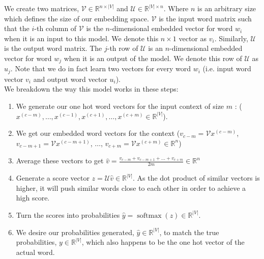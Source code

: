 \documentclass[nobib]{tufte-handout}
\begin{document}
We create two matrices, $\mathcal{V} \in \mathbb{R}^{n\times|V|}$ and $\mathcal{U} \in \mathbb{R}^{|V|\times n}$. Where $n$ is an arbitrary size which defines the size of our embedding space. $\mathcal{V}$ is the input word matrix such that the $i$-th column of $\mathcal{V}$ is the $n$-dimensional embedded vector for word $w_{i}$ when it is an input to this model. We denote this $n\times1$ vector as $v_{i}$. Similarly, $\mathcal{U}$ is the output word matrix. The $j$-th row of $\mathcal{U}$ is an $n$-dimensional embedded vector for word $w_{j}$ when it is an output of the model. We denote this row of $\mathcal{U}$ as $u_{j}$. Note that we do in fact learn two vectors for every word $w_{i}$ (i.e. input word vector $v_{i}$ and output word vector $u_{i}$).
$$ $$
We breakdown the way this model works in these steps:
\begin{enumerate}
\item We generate our one hot word vectors  for the input context of size $m$ : ($x^{(c-m)}, \hdots, x^{(c-1)}, x^{(c+1)},\hdots, x^{(c+m)} \in \mathbb{R}^{|V|}$).
\item We get our embedded word vectors for the context ($v_{c-m}=\mathcal{V}x^{(c-m)}$, $v_{c-m+1}=\mathcal{V}x^{(c-m+1)}$, $\hdots$, $v_{c+m}=\mathcal{V}x^{(c+m)} \in \mathbb{R}^n$) 
\item Average these vectors to get $\hat{v} = \frac{v_{c-m}+v_{c-m+1}+... + v_{c+m}}{2m} \in \mathbb{R}^n$
\item Generate a score vector $z=\mathcal{U}\hat{v} \in \mathbb{R}^{|V|}$. As the dot product of similar vectors is higher, it will push similar words close to each other in order to achieve a high score.
\item Turn the scores into probabilities $\hat{y}=\operatorname{softmax}(z) \in \mathbb{R}^{|V|}$. 
\item We desire our probabilities generated, $\hat{y} \in \mathbb{R}^{|V|}$, to match the true probabilities, $y \in \mathbb{R}^{|V|}$, which also happens to be the one hot vector of the actual word.
\end{enumerate}
\end{document}
